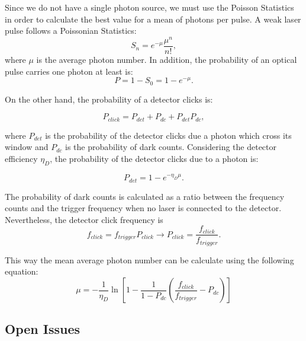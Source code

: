 Since we do not have a single photon source, we must use the Poisson Statistics in order to calculate the best value for a mean of photons per pulse. A weak laser pulse follows a Poissonian Statistics\cite{markfox}:
\begin{equation}\label{eq:poisson}
  S_n = e^{-\mu}\frac{\mu^{n}}{n!},
\end{equation}
where $\mu$ is the average photon number. In addition, the probability of an optical pulse carries one photon at least is:
\begin{equation}\label{eq:prob1photon}
  P = 1 - S_0 = 1 - e^{-\mu}.
\end{equation}

On the other hand, the probability of a detector clicks is:

\begin{equation}\label{eq:detectorclickprob}
  P_{click} = P_{det}+P_{dc} + P_{det}P_{dc},
\end{equation}

where $P_{det}$ is the probability of the detector clicks due a photon which cross its window and $P_{dc}$ is the probability of dark counts. Considering the detector efficiency $\eta_{D}$, the probability of the detector clicks due to a photon is:

\begin{equation}\label{eq:probclickefficiency}
  P_{det} = 1 - e^{- \eta_{D}\mu}.
\end{equation}

The probability of dark counts is calculated as a ratio between the frequency counts and the trigger frequency when no laser is connected to the detector. Nevertheless, the detector click frequency is
\begin{equation}\label{eq:frequencyclick}
  f_{click} = f_{trigger}P_{click} \longrightarrow P_{click}=\frac{f_{click}}{f_{trigger}}.
\end{equation}

This way the mean average photon number can be calculate using the following equation:
\begin{equation}\label{eq:meanphotonnumber}
  \mu = - \frac{1}{\eta_{D}}\ln\left [1-\frac{1}{1-P_{dc}}\left (\frac{f_{click}}{f_{trigger}}-P_{dc} \right)\right]
\end{equation}

\subsection{Open Issues}

\newpage



\renewcommand{\bibname}{References}
%


%
%


\cleardoublepage
